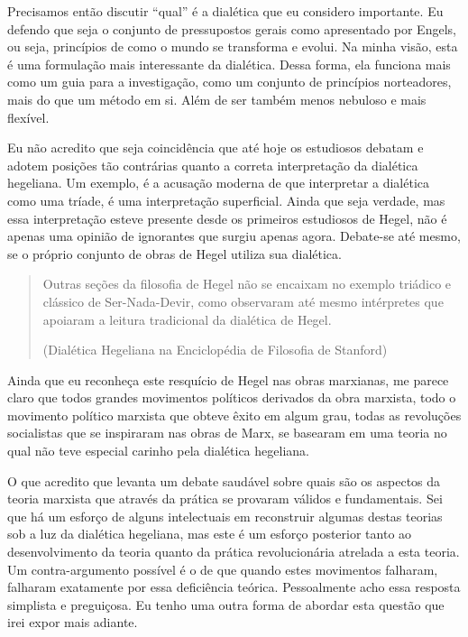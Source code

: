 Precisamos então discutir “qual” é a dialética que eu considero importante. Eu defendo que seja o conjunto de pressupostos gerais como apresentado por Engels, ou seja, princípios de como o mundo se transforma e evolui. Na minha visão, esta é uma formulação mais interessante da dialética. Dessa forma, ela funciona mais como um guia para a investigação, como um conjunto de princípios norteadores, mais do que um método em si. Além de ser também menos nebuloso e mais flexível.

Eu não acredito que seja coincidência que até hoje os estudiosos debatam e adotem posições tão contrárias quanto a correta interpretação da dialética hegeliana. Um exemplo, é a acusação moderna de que interpretar a dialética como uma tríade, é uma interpretação superficial. Ainda que seja verdade, mas essa interpretação esteve presente desde os primeiros estudiosos de Hegel, não é apenas uma opinião de ignorantes que surgiu apenas agora. Debate-se até mesmo, se o próprio conjunto de obras de Hegel utiliza sua dialética.

\begin{quote}
Outras seções da filosofia de Hegel não se encaixam no exemplo triádico e clássico de Ser-Nada-Devir, como observaram até mesmo intérpretes que apoiaram a leitura tradicional da dialética de Hegel.

(Dialética Hegeliana na Enciclopédia de Filosofia de Stanford)
\end{quote}

Ainda que eu reconheça este resquício de Hegel nas obras marxianas, me parece claro que todos grandes movimentos políticos derivados da obra marxista, todo o movimento político marxista que obteve êxito em algum grau, todas as revoluções socialistas que se inspiraram nas obras de Marx, se basearam em uma teoria no qual não teve especial carinho pela dialética hegeliana.

O que acredito que levanta um debate saudável sobre quais são os aspectos da teoria marxista que através da prática se provaram válidos e fundamentais. Sei que há um esforço de alguns intelectuais em reconstruir algumas destas teorias sob a luz da dialética hegeliana, mas este é um esforço posterior tanto ao desenvolvimento da teoria quanto da prática revolucionária atrelada a esta teoria. Um contra-argumento possível é o de que quando estes movimentos falharam, falharam exatamente por essa deficiência teórica. Pessoalmente acho essa resposta simplista e preguiçosa. Eu tenho uma outra forma de abordar esta questão que irei expor mais adiante.

